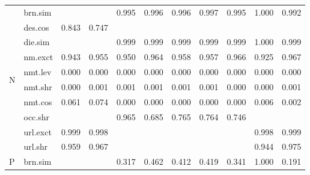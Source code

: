 \documentclass[epsfig,a4paper,11pt,titlepage,twoside,openany]{book}
\begin{document}
\begin{table}[]
\begin{tabular}{ll|l|l|l|l|l|l|l|l|l|}
\multicolumn{1}{|l|}{\multirow{10}{*}{N}}       & brn.sim  &             &                & 0.995 & 0.996    & 0.996    & 0.997    & 0.995  & 1.000         & 0.992            \\ \cline{2-11} 
\multicolumn{1}{|l|}{}                                 & des.cos  & 0.843       & 0.747          &       &          &          &          &        &               &                  \\ \cline{2-11} 
\multicolumn{1}{|l|}{}                                 & die.sim  &             &                & 0.999 & 0.999    & 0.999    & 0.999    & 0.999  & 1.000         & 0.999            \\ \cline{2-11} 
\multicolumn{1}{|l|}{}                                 & nm.exct  & 0.943       & 0.955          & 0.950 & 0.964    & 0.958    & 0.957    & 0.966  & 0.925         & 0.967            \\ \cline{2-11} 
\multicolumn{1}{|l|}{}                                 & nmt.lev  & 0.000       & 0.000          & 0.000 & 0.000    & 0.000    & 0.000    & 0.000  & 0.000         & 0.000            \\ \cline{2-11} 
\multicolumn{1}{|l|}{}                                 & nmt.shr  & 0.000       & 0.001          & 0.001 & 0.001    & 0.001    & 0.001    & 0.000  & 0.000         & 0.001            \\ \cline{2-11} 
\multicolumn{1}{|l|}{}                                 & nmt.cos  & 0.061       & 0.074          & 0.000 & 0.000    & 0.000    & 0.000    & 0.000  & 0.006         & 0.002            \\ \cline{2-11} 
\multicolumn{1}{|l|}{}                                 & occ.shr  &             &                & 0.965 & 0.685    & 0.765    & 0.764    & 0.746  &               &                  \\ \cline{2-11} 
\multicolumn{1}{|l|}{}                                 & url.exct & 0.999       & 0.998          &       &          &          &          &        & 0.998         & 0.999            \\ \cline{2-11} 
\multicolumn{1}{|l|}{}                                 & url.shr  & 0.959       & 0.967          &       &          &          &          &        & 0.944         & 0.975            \\ \hline \hline
\multicolumn{1}{|l|}{\multirow{10}{*}{P}}       & brn.sim  &             &                & 0.317 & 0.462    & 0.412    & 0.419    & 0.341  & 1.000         & 0.191            \\ \cline{2-11} 

\end{tabular}
\end{table}
\end{document}
